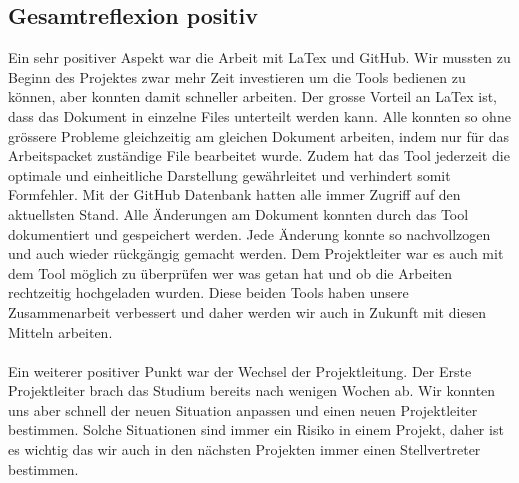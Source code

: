 \documentclass[12pt]{article}
\begin{document}
\subsection{Gesamtreflexion positiv}

Ein sehr positiver Aspekt war die Arbeit mit LaTex und GitHub.  Wir mussten zu Beginn des Projektes zwar mehr Zeit investieren um die Tools bedienen zu können, aber konnten damit schneller arbeiten. Der grosse Vorteil an LaTex ist, dass das Dokument in einzelne Files unterteilt werden kann. Alle konnten so ohne grössere Probleme gleichzeitig am gleichen Dokument arbeiten, indem nur für das Arbeitspacket zuständige File bearbeitet wurde.  Zudem hat das Tool jederzeit die optimale und einheitliche Darstellung gewährleitet und verhindert somit Formfehler. Mit der GitHub Datenbank hatten alle immer Zugriff auf den aktuellsten Stand. Alle Änderungen am Dokument konnten durch das Tool dokumentiert und gespeichert werden. Jede Änderung konnte so nachvollzogen und auch wieder rückgängig gemacht werden. Dem Projektleiter war es auch mit dem Tool möglich zu überprüfen wer was getan hat und ob die Arbeiten rechtzeitig hochgeladen wurden. Diese beiden Tools haben unsere Zusammenarbeit verbessert und daher werden wir auch in Zukunft mit diesen Mitteln arbeiten.
\\
\\
Ein weiterer positiver Punkt war der Wechsel der Projektleitung. Der Erste Projektleiter brach das Studium bereits nach wenigen Wochen ab. Wir konnten uns aber schnell der neuen Situation anpassen und einen neuen Projektleiter bestimmen. Solche Situationen sind immer ein Risiko in einem Projekt, daher ist es wichtig das wir auch in den nächsten Projekten immer einen Stellvertreter bestimmen.
\end{document}
